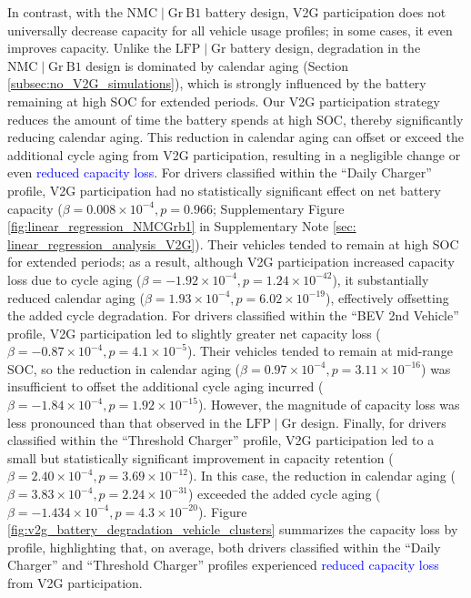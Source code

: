 \documentclass[pdflatex,sn-nature]{sn-jnl}%
\theoremstyle{thmstyleone}%
\theoremstyle{thmstyletwo}%
\theoremstyle{thmstylethree}%
\begin{document}
In contrast, with the $\mathrm{NMC}\mid\mathrm{Gr~B1}$ battery design, V2G participation does not universally decrease capacity for all vehicle usage profiles; in some cases, it even improves capacity. Unlike the $\mathrm{LFP}\mid\mathrm{Gr}$ battery design, degradation in the $\mathrm{NMC}\mid\mathrm{Gr~B1}$ design is dominated by calendar aging (Section \ref{subsec:no_V2G_simulations}), which is strongly influenced by the battery remaining at high SOC for extended periods. Our V2G participation strategy reduces the amount of time the battery spends at high SOC, thereby significantly reducing calendar aging. This reduction in calendar aging can offset or exceed the additional cycle aging from V2G participation, resulting in a negligible change or even \textcolor{blue}{reduced capacity loss}. For drivers classified within the ``Daily Charger'' profile, V2G participation had no statistically significant effect on net battery capacity ($\beta = 0.008 \times 10^{-4}, p = 0.966$; Supplementary Figure \ref{fig:linear_regression_NMCGrb1} in Supplementary Note \ref{sec: linear_regression_analysis_V2G}). Their vehicles tended to remain at high SOC for extended periods; as a result, although V2G participation increased capacity loss due to cycle aging ($\beta = -1.92 \times 10^{-4}, p = 1.24 \times 10^{-42}$), it substantially reduced calendar aging ($\beta = 1.93 \times 10^{-4}, p = 6.02 \times 10^{-19}$), effectively offsetting the added cycle degradation. For drivers classified within the ``BEV 2nd Vehicle'' profile, V2G participation led to slightly greater net capacity loss ($\beta = -0.87 \times 10^{-4}, p = 4.1 \times 10^{-5}$). Their vehicles tended to remain at mid-range SOC, so the reduction in calendar aging ($\beta = 0.97 \times 10^{-4}, p = 3.11 \times 10^{-16}$) was insufficient to offset the additional cycle aging incurred ($\beta = -1.84 \times 10^{-4}, p = 1.92 \times 10^{-15}$). However, the magnitude of capacity loss was less pronounced than that observed in the $\mathrm{LFP}\mid\mathrm{Gr}$ design. Finally, for drivers classified within the ``Threshold Charger'' profile, V2G participation led to a small but statistically significant improvement in capacity retention ($\beta = 2.40 \times 10^{-4}, p = 3.69 \times 10^{-12}$). In this case, the reduction in calendar aging ($\beta = 3.83 \times 10^{-4}, p = 2.24 \times 10^{-31}$) exceeded the added cycle aging ($\beta = -1.434 \times 10^{-4}, p = 4.3 \times 10^{-20}$). Figure \ref{fig:v2g_battery_degradation_vehicle_clusters} summarizes the capacity loss by profile, highlighting that, on average, both drivers classified within the ``Daily Charger'' and ``Threshold Charger'' profiles experienced \textcolor{blue}{reduced capacity loss} from V2G participation.
\end{document}
